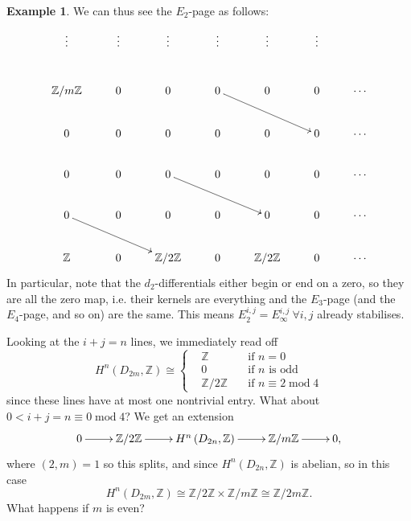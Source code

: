 \documentclass{article}
\newcommand{\Z}{\mathbb{Z}}
\newcommand{\Mod}{\operatorname{mod}}
\theoremstyle{definition}
\newtheorem{example}[defn]{Example}
\begin{document}
\begin{example}
We can thus see the $E_2$-page as follows:
\[
\xymatrix{
\vdots & \vdots & \vdots & \vdots & \vdots & \vdots \\
\Z/m\Z & 0 & 0 & 0\ar[rrd] & 0 & 0 & \cdots \\
0 & 0 & 0 & 0 & 0 & 0 & \cdots \\
0 & 0 & 0\ar[rrd] & 0 & 0 & 0 & \cdots \\
0\ar[rrd] & 0 & 0 & 0 & 0 & 0 & \cdots \\
\Z & 0 & \Z/2\Z & 0 & \Z/2\Z & 0 & \cdots
}
\]
In particular, note that the $d_2$-differentials either begin or end on a zero, so they are all the zero map, i.e. their kernels are everything and the $E_3$-page (and the $E_4$-page, and so on) are the same. This means $E_2^{i,j}=E_\infty^{i,j} \ \forall i,j$ already stabilises.

Looking at the $i+j=n$ lines, we immediately read off
\[
H^n\left(D_{2m},\Z\right)\cong\left\{
\begin{aligned}
&\Z\quad&\text{if }n=0\\
&0\quad&\text{if }n\text{ is odd}\\
&\Z/2\Z\quad&\text{if }n\equiv 2\Mod 4
\end{aligned}
\right.
\]
since these lines have at most one nontrivial entry. What about $0<i+j=n\equiv 0\Mod 4$? We get an extension
\[
\xymatrix{
0\ar[r] & \Z/2\Z\ar[r] & H^n\left(D_{2n},\Z\right)\ar[r] & \Z/m\Z\ar[r] & 0,
}
\]
where $(2,m)=1$ so this splits, and since $H^n\left(D_{2n},\Z\right)$ is abelian, so in this case
\[
H^n\left(D_{2m},\Z\right)\cong\Z/2\Z\times\Z/m\Z\cong\Z/2m\Z.
\]
What happens if $m$ is even?
\end{example}
\end{document}

